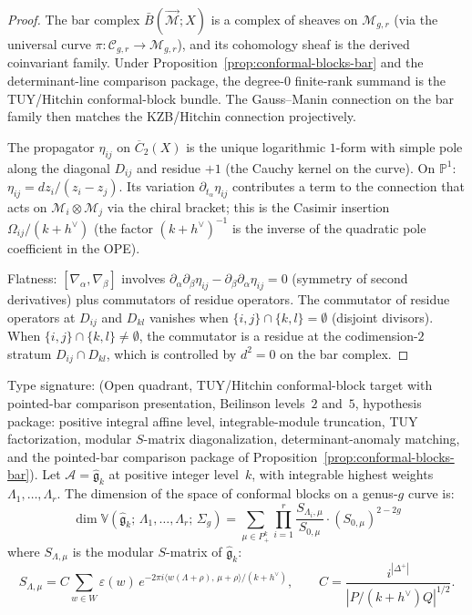 \begin{proof}
The bar complex $\bar{B}(\vec{\mathcal{M}}; X)$ is a complex of
sheaves on $\mathcal{M}_{g,r}$ (via the universal curve
$\pi\colon \mathcal{C}_{g,r} \to \mathcal{M}_{g,r}$), and its
cohomology sheaf is the derived coinvariant family. Under
Proposition~\ref{prop:conformal-blocks-bar} and the determinant-line
comparison package, the degree-$0$ finite-rank summand is the
TUY/Hitchin conformal-block bundle. The Gauss--Manin connection on the
bar family then matches the KZB/Hitchin connection projectively.

The propagator $\eta_{ij}$ on $\overline{C}_2(X)$ is the unique
logarithmic $1$-form with simple pole along the diagonal $D_{ij}$
and residue $+1$ (the Cauchy kernel on the curve). On
$\mathbb{P}^1$: $\eta_{ij} = dz_i/(z_i - z_j)$. Its variation
$\partial_{t_\alpha} \eta_{ij}$ contributes a term to the
connection that acts on $\mathcal{M}_i \otimes \mathcal{M}_j$
via the chiral bracket; this is the Casimir insertion
$\Omega_{ij}/(k + h^\vee)$ (the factor $(k + h^\vee)^{-1}$
is the inverse of the quadratic pole coefficient in the OPE).

Flatness: $[\nabla_\alpha, \nabla_\beta]$ involves
$\partial_\alpha \partial_\beta \eta_{ij}
- \partial_\beta \partial_\alpha \eta_{ij} = 0$ (symmetry
of second derivatives) plus commutators of residue operators.
The commutator of residue operators at $D_{ij}$ and $D_{kl}$
vanishes when $\{i,j\} \cap \{k,l\} = \emptyset$ (disjoint
divisors). When $\{i,j\} \cap \{k,l\} \neq \emptyset$, the
commutator is a residue at the codimension-$2$ stratum
$D_{ij} \cap D_{kl}$, which is controlled by $d^2 = 0$ on
the bar complex.
\end{proof}

\begin{theorem}
\label{thm:verlinde-bar}
Type signature: \textup{(}Open quadrant, TUY/Hitchin
conformal-block target with pointed-bar comparison presentation,
Beilinson levels~$2$ and~$5$, hypothesis package: positive integral
affine level, integrable-module truncation, TUY factorization,
modular \(S\)-matrix diagonalization, determinant-anomaly matching,
and the pointed-bar comparison package of
Proposition~\textup{\ref{prop:conformal-blocks-bar}}\textup{)}.
Let $\mathcal{A} = \widehat{\mathfrak{g}}_k$ at positive integer
level~$k$, with integrable highest weights
$\Lambda_1, \ldots, \Lambda_r$. The dimension of the space of
conformal blocks on a genus-$g$ curve is:
\begin{equation}\label{eq:verlinde}
\dim \mathbb{V}(\widehat{\mathfrak{g}}_k;\,
\Lambda_1, \ldots, \Lambda_r;\, \Sigma_g)
= \sum_{\mu \in P_+^k}
\prod_{i=1}^r \frac{S_{\Lambda_i,\mu}}{S_{0,\mu}}
\cdot (S_{0,\mu})^{2-2g}
\end{equation}
where $S_{\Lambda,\mu}$ is the modular $S$-matrix of
$\widehat{\mathfrak{g}}_k$\textup{:}
\[
S_{\Lambda,\mu}
= C \sum_{w \in W} \varepsilon(w)\,
e^{-2\pi i \langle w(\Lambda + \rho),\, \mu + \rho \rangle/(k + h^\vee)},
\qquad
C = \frac{i^{|\Delta^+|}}{|P/(k+h^\vee)Q|^{1/2}}.
\]
\end{theorem}

